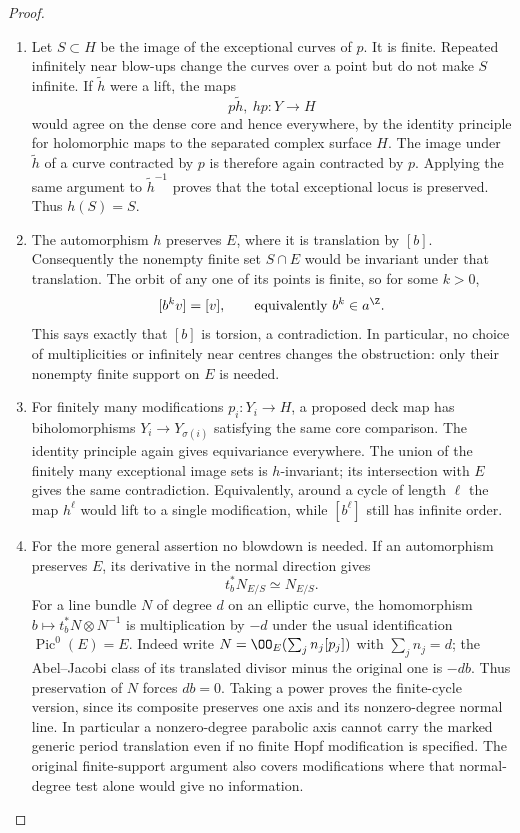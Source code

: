 \begin{proof}
\begin{enumerate}[label=\arabic*.,leftmargin=*]
\item Let $S\subset H$ be the image of the exceptional curves of $p$.
It is finite. Repeated infinitely near blow-ups change the curves
over a point but do not make $S$ infinite.
If $\widetilde h$ were a lift, the maps
\[
 p\widetilde h,\ hp:Y\longrightarrow H
\]
would agree on the dense core and hence everywhere, by the identity
principle for holomorphic maps to the separated complex surface $H$.
The image under $\widetilde h$ of a curve contracted by $p$ is
therefore again contracted by $p$. Applying the same argument to
$\widetilde h^{-1}$ proves that the total exceptional locus is
preserved. Thus $h(S)=S$.

\item The automorphism $h$ preserves $E$, where it is translation by
$[b]$. Consequently the nonempty finite set $S\cap E$ would be
invariant under that translation. The orbit of any one of its
points is finite, so for some $k>0$,
\[
 [b^k v]=[v],\qquad\text{equivalently } b^k\in a^\Z.
\]
This says exactly that $[b]$ is torsion, a contradiction.
In particular, no choice of multiplicities or infinitely near
centres changes the obstruction: only their nonempty finite
support on $E$ is needed.

\item For finitely many modifications $p_i:Y_i\to H$, a proposed deck
map has biholomorphisms
$Y_i\to Y_{\sigma(i)}$ satisfying the same core comparison.
The identity principle again gives equivariance everywhere.
The union of the finitely many exceptional image sets is
$h$-invariant; its intersection with $E$ gives the same contradiction.
Equivalently, around a cycle of length $\ell$ the map $h^\ell$
would lift to a single modification, while $[b^\ell]$ still has
infinite order.

\item For the more general assertion no blowdown is needed.
If an automorphism preserves $E$, its derivative in the normal
direction gives
\[
 t_b^*N_{E/S}\simeq N_{E/S}.
\]
For a line bundle $N$ of degree $d$ on an elliptic curve, the
homomorphism $b\mapsto t_b^*N\otimes N^{-1}$ is multiplication
by $-d$ under the usual identification $\operatorname{Pic}^0(E)=E$.
Indeed write $N=\OO_E(\sum_j n_j[p_j])$ with
$\sum_j n_j=d$; the Abel--Jacobi class of its translated divisor
minus the original one is $-d b$.
Thus preservation of $N$ forces $d b=0$.
Taking a power proves the finite-cycle version, since its composite
preserves one axis and its nonzero-degree normal line.
In particular a nonzero-degree parabolic axis cannot carry the
marked generic period translation even if no finite Hopf
modification is specified. The original finite-support argument
also covers modifications where that normal-degree test alone
would give no information.


\end{enumerate}
\end{proof}
